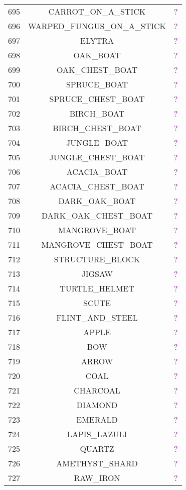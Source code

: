 \documentclass[11pt]{article}
\newcommand\myworries[1]{\textcolor{purple}{#1}}
\begin{document}
\begin{longtable}{ |c|c|c| }
	695 & CARROT\_ON\_A\_STICK & \myworries{?} \\
	696 & WARPED\_FUNGUS\_ON\_A\_STICK & \myworries{?} \\
	697 & ELYTRA & \myworries{?} \\
	698 & OAK\_BOAT & \myworries{?} \\
	699 & OAK\_CHEST\_BOAT & \myworries{?} \\
	700 & SPRUCE\_BOAT & \myworries{?} \\
	701 & SPRUCE\_CHEST\_BOAT & \myworries{?} \\
	702 & BIRCH\_BOAT & \myworries{?} \\
	703 & BIRCH\_CHEST\_BOAT & \myworries{?} \\
	704 & JUNGLE\_BOAT & \myworries{?} \\
	705 & JUNGLE\_CHEST\_BOAT & \myworries{?} \\
	706 & ACACIA\_BOAT & \myworries{?} \\
	707 & ACACIA\_CHEST\_BOAT & \myworries{?} \\
	708 & DARK\_OAK\_BOAT & \myworries{?} \\
	709 & DARK\_OAK\_CHEST\_BOAT & \myworries{?} \\
	710 & MANGROVE\_BOAT & \myworries{?} \\
	711 & MANGROVE\_CHEST\_BOAT & \myworries{?} \\
	712 & STRUCTURE\_BLOCK & \myworries{?} \\
	713 & JIGSAW & \myworries{?} \\
	714 & TURTLE\_HELMET & \myworries{?} \\
	715 & SCUTE & \myworries{?} \\
	716 & FLINT\_AND\_STEEL & \myworries{?} \\
	717 & APPLE & \myworries{?} \\
	718 & BOW & \myworries{?} \\
	719 & ARROW & \myworries{?} \\
	720 & COAL & \myworries{?} \\
	721 & CHARCOAL & \myworries{?} \\
	722 & DIAMOND & \myworries{?} \\
	723 & EMERALD & \myworries{?} \\
	724 & LAPIS\_LAZULI & \myworries{?} \\
	725 & QUARTZ & \myworries{?} \\
	726 & AMETHYST\_SHARD & \myworries{?} \\
	727 & RAW\_IRON & \myworries{?} \\

\end{longtable}
\end{document}
